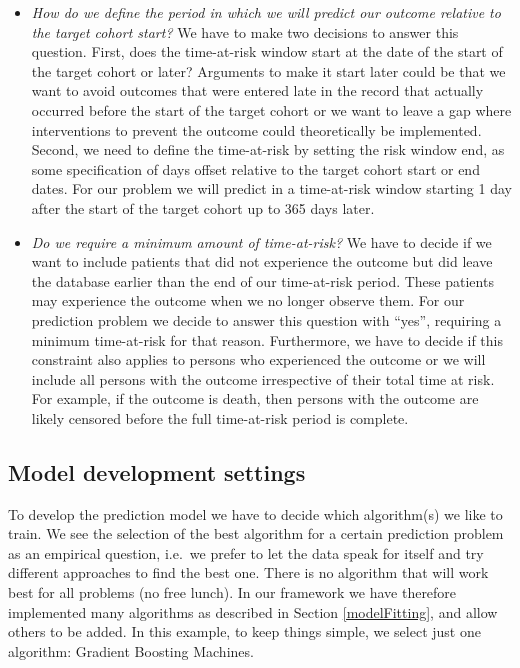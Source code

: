 \documentclass[11pt]{book}
\theoremstyle{definition}
\theoremstyle{definition}
\theoremstyle{definition}
\theoremstyle{remark}
\begin{document}
\begin{itemize}
\item
  \emph{How do we define the period in which we will predict our outcome relative to the target cohort start?} We have to make two decisions to answer this question. First, does the time-at-risk window start at the date of the start of the target cohort or later? Arguments to make it start later could be that we want to avoid outcomes that were entered late in the record that actually occurred before the start of the target cohort or we want to leave a gap where interventions to prevent the outcome could theoretically be implemented. Second, we need to define the time-at-risk by setting the risk window end, as some specification of days offset relative to the target cohort start or end dates. For our problem we will predict in a time-at-risk window starting 1 day after the start of the target cohort up to 365 days later.
\item
  \emph{Do we require a minimum amount of time-at-risk?} We have to decide if we want to include patients that did not experience the outcome but did leave the database earlier than the end of our time-at-risk period. These patients may experience the outcome when we no longer observe them. For our prediction problem we decide to answer this question with ``yes'', requiring a minimum time-at-risk for that reason. Furthermore, we have to decide if this constraint also applies to persons who experienced the outcome or we will include all persons with the outcome irrespective of their total time at risk. For example, if the outcome is death, then persons with the outcome are likely censored before the full time-at-risk period is complete.
\end{itemize}

\hypertarget{model-development-settings}{%
\subsection{Model development settings}\label{model-development-settings}}

To develop the prediction model we have to decide which algorithm(s) we like to train. We see the selection of the best algorithm for a certain prediction problem as an empirical question, i.e.~we prefer to let the data speak for itself and try different approaches to find the best one. There is no algorithm that will work best for all problems (no free lunch). In our framework we have therefore implemented many algorithms as described in Section \ref{modelFitting}, and allow others to be added. In this example, to keep things simple, we select just one algorithm: Gradient Boosting Machines.
\end{document}
